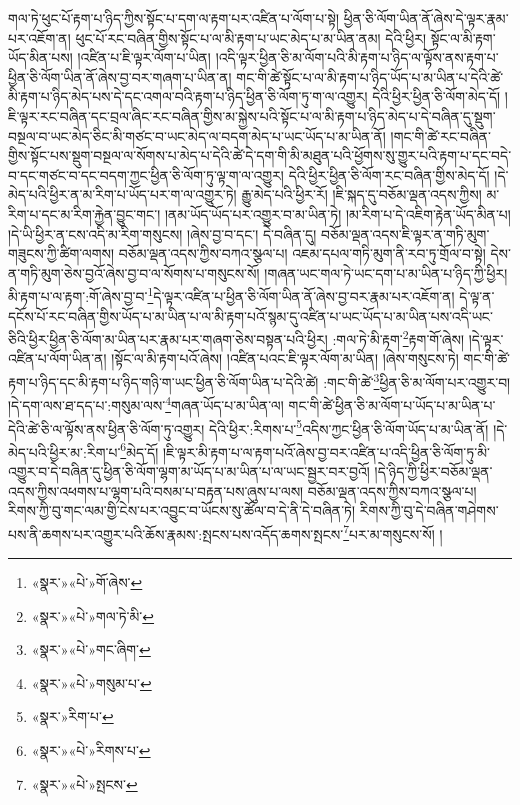 གལ་ཏེ་ཕུང་པོ་རྟག་པ་ཉིད་ཀྱིས་སྟོང་པ་དག་ལ་རྟག་པར་འཛིན་པ་ལོག་པ་སྟེ། ཕྱིན་ཅི་ལོག་ཡིན་ནོ་ཞེས་དེ་ལྟར་རྣམ་པར་འཇོག་ན། ཕུང་པོ་རང་བཞིན་གྱིས་སྟོང་པ་ལ་མི་རྟག་པ་ཡང་མེད་པ་མ་ཡིན་ནམ། དེའི་ཕྱིར། སྟོང་ལ་མི་རྟག་ཡོད་མིན་པས། །འཛིན་པ་ཇི་ལྟར་ལོག་པ་ཡིན། །འདི་ལྟར་ཕྱིན་ཅི་མ་ལོག་པའི་མི་རྟག་པ་ཉིད་ལ་ལྟོས་ནས་རྟག་པ་ཕྱིན་ཅི་ལོག་ཡིན་ནོ་ཞེས་བྱ་བར་གཞག་པ་ཡིན་ན། གང་གི་ཚེ་སྟོང་པ་ལ་མི་རྟག་པ་ཉིད་ཡོད་པ་མ་ཡིན་པ་དེའི་ཚེ་མི་རྟག་པ་ཉིད་མེད་པས་དེ་དང་འགལ་བའི་རྟག་པ་ཉིད་ཕྱིན་ཅི་ལོག་ཏུ་ག་ལ་འགྱུར། དེའི་ཕྱིར་ཕྱིན་ཅི་ལོག་མེད་དོ། །ཇི་ལྟར་རང་བཞིན་དང་བྲལ་ཞིང་རང་བཞིན་གྱིས་མ་སྐྱེས་པའི་སྟོང་པ་ལ་མི་རྟག་པ་ཉིད་མེད་པ་དེ་བཞིན་དུ་སྡུག་བསྔལ་བ་ཡང་མེད་ཅིང་མི་གཙང་བ་ཡང་མེད་ལ་བདག་མེད་པ་ཡང་ཡོད་པ་མ་ཡིན་ནོ། །གང་གི་ཚེ་རང་བཞིན་གྱིས་སྟོང་པས་སྡུག་བསྔལ་ལ་སོགས་པ་མེད་པ་དེའི་ཚེ་དེ་དག་གི་མི་མཐུན་པའི་ཕྱོགས་སུ་གྱུར་པའི་རྟག་པ་དང་བདེ་བ་དང་གཙང་བ་དང་བདག་ཀྱང་ཕྱིན་ཅི་ལོག་ཏུ་ལྟ་ག་ལ་འགྱུར། དེའི་ཕྱིར་ཕྱིན་ཅི་ལོག་རང་བཞིན་གྱིས་མེད་དོ། །དེ་མེད་པའི་ཕྱིར་ན་མ་རིག་པ་ཡོད་པར་ག་ལ་འགྱུར་ཏེ། རྒྱུ་མེད་པའི་ཕྱིར་རོ། །ཇི་སྐད་དུ་བཅོམ་ལྡན་འདས་ཀྱིས། མ་རིག་པ་དང་མ་རིག་རྐྱེན་བྱུང་གང་། །ནམ་ཡོད་ཡོད་པར་འགྱུར་བ་མ་ཡིན་ཏེ། །མ་རིག་པ་དེ་འཇིག་རྟེན་ཡོད་མིན་པ། །དེ་ཡི་ཕྱིར་ན་ངས་འདི་མ་རིག་གསུངས། །ཞེས་བྱ་བ་དང་། དེ་བཞིན་དུ། བཅོམ་ལྡན་འདས་ཇི་ལྟར་ན་གཏི་མུག་གཟུངས་ཀྱི་ཚིག་ལགས། བཅོམ་ལྡན་འདས་ཀྱིས་བཀའ་སྩལ་པ། འཇམ་དཔལ་གཏི་མུག་ནི་རབ་ཏུ་གྲོལ་བ་སྟེ། དེས་ན་གཏི་མུག་ཅེས་བྱའོ་ཞེས་བྱ་བ་ལ་སོགས་པ་གསུངས་སོ། །གཞན་ཡང་གལ་ཏེ་ཡང་དག་པ་མ་ཡིན་པ་ཉིད་ཀྱི་ཕྱིར། མི་རྟག་པ་ལ་རྟག་:གོ་ཞེས་བྱ་བ་\footnote{«སྣར་»«པེ་»གོ་ཞེས་}དེ་ལྟར་འཛིན་པ་ཕྱིན་ཅི་ལོག་ཡིན་ནོ་ཞེས་བྱ་བར་རྣམ་པར་འཇོག་ན། དེ་ལྟ་ན་དངོས་པོ་རང་བཞིན་གྱིས་ཡོད་པ་མ་ཡིན་པ་ལ་མི་རྟག་པའོ་སྙམ་དུ་འཛིན་པ་ཡང་ཡོད་པ་མ་ཡིན་པས་འདི་ཡང་ཅིའི་ཕྱིར་ཕྱིན་ཅི་ལོག་མ་ཡིན་པར་རྣམ་པར་གཞག་ཅེས་བསྟན་པའི་ཕྱིར། :གལ་ཏེ་མི་རྟག་\footnote{«སྣར་»«པེ་»གལ་ཏེ་མི་}རྟག་གོ་ཞེས། །དེ་ལྟར་འཛིན་པ་ལོག་ཡིན་ན། །སྟོང་ལ་མི་རྟག་པའོ་ཞེས། །འཛིན་པའང་ཇི་ལྟར་ལོག་མ་ཡིན། །ཞེས་གསུངས་ཏེ། གང་གི་ཚེ་རྟག་པ་ཉིད་དང་མི་རྟག་པ་ཉིད་གཉི་ག་ཡང་ཕྱིན་ཅི་ལོག་ཡིན་པ་དེའི་ཚེ། :གང་གི་ཚེ་\footnote{«སྣར་»«པེ་»གང་ཞིག་}ཕྱིན་ཅི་མ་ལོག་པར་འགྱུར་བ། །དེ་དག་ལས་ཐ་དད་པ་:གསུམ་ལས་\footnote{«སྣར་»«པེ་»གསུམ་པ་}གཞན་ཡོད་པ་མ་ཡིན་ལ། གང་གི་ཚེ་ཕྱིན་ཅི་མ་ལོག་པ་ཡོད་པ་མ་ཡིན་པ་དེའི་ཚེ་ཅི་ལ་ལྟོས་ནས་ཕྱིན་ཅི་ལོག་ཏུ་འགྱུར། དེའི་ཕྱིར་:རིགས་པ་\footnote{«སྣར་»རིག་པ་}འདིས་ཀྱང་ཕྱིན་ཅི་ལོག་ཡོད་པ་མ་ཡིན་ནོ། །དེ་མེད་པའི་ཕྱིར་མ་:རིག་པ་\footnote{«སྣར་»«པེ་»རིགས་པ་}མེད་དོ། །ཇི་ལྟར་མི་རྟག་པ་ལ་རྟག་པའོ་ཞེས་བྱ་བར་འཛིན་པ་འདི་ཕྱིན་ཅི་ལོག་ཏུ་མི་འགྱུར་བ་དེ་བཞིན་དུ་ཕྱིན་ཅི་ལོག་ལྷག་མ་ཡོད་པ་མ་ཡིན་པ་ལ་ཡང་སྦྱར་བར་བྱའོ། །དེ་ཉིད་ཀྱི་ཕྱིར་བཅོམ་ལྡན་འདས་ཀྱིས་འཕགས་པ་ལྷག་པའི་བསམ་པ་བརྟན་པས་ཞུས་པ་ལས། བཅོམ་ལྡན་འདས་ཀྱིས་བཀའ་སྩལ་པ། རིགས་ཀྱི་བུ་གང་ལམ་གྱི་ངེས་པར་འབྱུང་བ་ཡོངས་སུ་ཚོལ་བ་དེ་ནི་དེ་བཞིན་ཏེ། རིགས་ཀྱི་བུ་དེ་བཞིན་གཤེགས་པས་ནི་ཆགས་པར་འགྱུར་པའི་ཆོས་རྣམས་:སྤངས་པས་འདོད་ཆགས་སྤངས་\footnote{«སྣར་»«པེ་»སྤངས་}པར་མ་གསུངས་སོ། །
